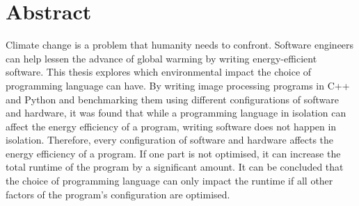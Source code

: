 \chapter*{Abstract}

Climate change is a problem that humanity needs to confront.
Software engineers can help lessen the advance of global warming by writing energy-efficient software.
This thesis explores which environmental impact the choice of programming language can have.
By writing image processing programs in C++ and Python and benchmarking them using different configurations of software and
hardware, it was found that while a programming language in isolation can affect the energy efficiency of a program,
writing software does not happen in isolation.
Therefore, every configuration of software and hardware affects the energy efficiency of a program.
If one part is not optimised, it can increase the total runtime of the program by a significant amount.
It can be concluded that the choice of programming language can only impact the runtime if all other factors of the program's configuration are optimised.

